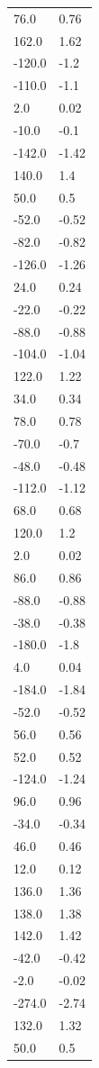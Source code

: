 \begin{longtable}{ll}
76.0 & 0.76 \\
162.0 & 1.62 \\
-120.0 & -1.2 \\
-110.0 & -1.1 \\
2.0 & 0.02 \\
-10.0 & -0.1 \\
-142.0 & -1.42 \\
140.0 & 1.4 \\
50.0 & 0.5 \\
-52.0 & -0.52 \\
-82.0 & -0.82 \\
-126.0 & -1.26 \\
24.0 & 0.24 \\
-22.0 & -0.22 \\
-88.0 & -0.88 \\
-104.0 & -1.04 \\
122.0 & 1.22 \\
34.0 & 0.34 \\
78.0 & 0.78 \\
-70.0 & -0.7 \\
-48.0 & -0.48 \\
-112.0 & -1.12 \\
68.0 & 0.68 \\
120.0 & 1.2 \\
2.0 & 0.02 \\
86.0 & 0.86 \\
-88.0 & -0.88 \\
-38.0 & -0.38 \\
-180.0 & -1.8 \\
4.0 & 0.04 \\
-184.0 & -1.84 \\
-52.0 & -0.52 \\
56.0 & 0.56 \\
52.0 & 0.52 \\
-124.0 & -1.24 \\
96.0 & 0.96 \\
-34.0 & -0.34 \\
46.0 & 0.46 \\
12.0 & 0.12 \\
136.0 & 1.36 \\
138.0 & 1.38 \\
142.0 & 1.42 \\
-42.0 & -0.42 \\
-2.0 & -0.02 \\
-274.0 & -2.74 \\
132.0 & 1.32 \\
50.0 & 0.5 \\

\end{longtable}
